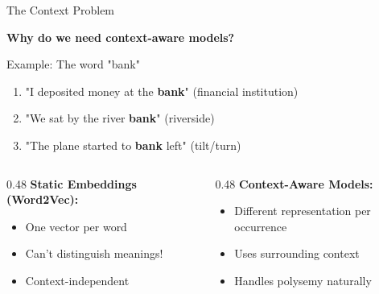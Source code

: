 \documentclass[aspectratio=169]{beamer}
\begin{document}
\begin{frame}[shrink=10]{The Context Problem 🤔}
\begin{center}
\LARGE
\textbf{Why do we need context-aware models?}
\end{center}

\pause
\vspace{1em}

\begin{exampleblock}{Example: The word "bank"}
\begin{enumerate}\setlength{\itemsep}{0pt}
    \item "I deposited money at the \textbf{bank}" (financial institution)
    \item "We sat by the river \textbf{bank}" (riverside)
    \item "The plane started to \textbf{bank} left" (tilt/turn)
\end{enumerate}
\end{exampleblock}

\vspace{1em}

\begin{columns}[T]
\begin{column}{0.48\textwidth}
\textbf{Static Embeddings (Word2Vec):}
\begin{itemize}\setlength{\itemsep}{0pt}
    \item One vector per word
    \item \alert{Can't distinguish meanings!}
    \item Context-independent
\end{itemize}
\end{column}

\pause

\begin{column}{0.48\textwidth}
\textbf{Context-Aware Models:}
\begin{itemize}\setlength{\itemsep}{0pt}
    \item Different representation per occurrence
    \item Uses surrounding context
    \item Handles polysemy naturally
\end{itemize}
\end{column}
\end{columns}
\end{frame}
\end{document}
